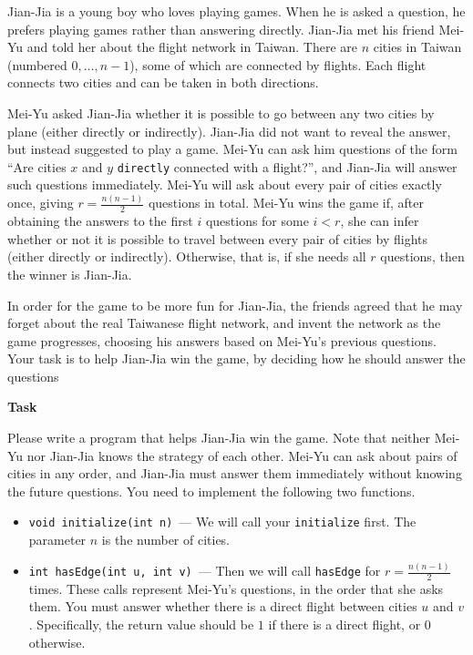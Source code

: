 Jian-Jia is a young boy who loves playing games. When he is asked a question, he prefers playing games rather than answering directly. Jian-Jia met his friend Mei-Yu and told her about the flight network in Taiwan. There are $n$ cities in Taiwan (numbered $0, \ldots, n - 1$), some of which are connected by flights. Each flight connects two cities and can be taken in both directions.

Mei-Yu asked Jian-Jia whether it is possible to go between any two cities by plane (either directly or indirectly). Jian-Jia did not want to reveal the answer, but instead suggested to play a game. Mei-Yu can ask him questions of the form ``Are cities $x$ and $y$ \texttt{directly} connected with a flight?'', and Jian-Jia will answer such questions immediately. Mei-Yu will ask about every pair of cities exactly once, giving $r = \frac{n(n - 1)}{2}$ questions in total. Mei-Yu wins the game if, after obtaining the answers to the first $i$ questions for some $i < r$, she can infer whether or not it is possible to travel between every pair of cities by flights (either directly or indirectly). Otherwise, that is, if she needs all $r$ questions, then the winner is Jian-Jia.

In order for the game to be more fun for Jian-Jia, the friends agreed that he may forget about the real Taiwanese flight network, and invent the network as the game progresses, choosing his answers based on Mei-Yu's previous questions. Your task is to help Jian-Jia win the game, by deciding how he should answer the questions

\textbf{Task}

Please write a program that helps Jian-Jia win the game. Note that neither Mei-Yu nor Jian-Jia knows the strategy of each other. Mei-Yu can ask about pairs of cities in any order, and Jian-Jia must answer them immediately without knowing the future questions. You need to implement the following two functions.

\begin{itemize}
\item \texttt{void initialize(int n)}~--- We will call your \texttt{initialize} first. The parameter $n$ is the number of cities.
\item \texttt{int hasEdge(int u, int v)}~--- Then we will call \texttt{hasEdge} for $r = \frac{n(n - 1)}{2}$ times. These calls represent Mei-Yu's questions, in the order that she asks them. You must answer whether there is a direct flight between cities $u$ and $v$. Specifically, the return value should be $1$ if there is a direct flight, or $0$ otherwise.
\end{itemize}
